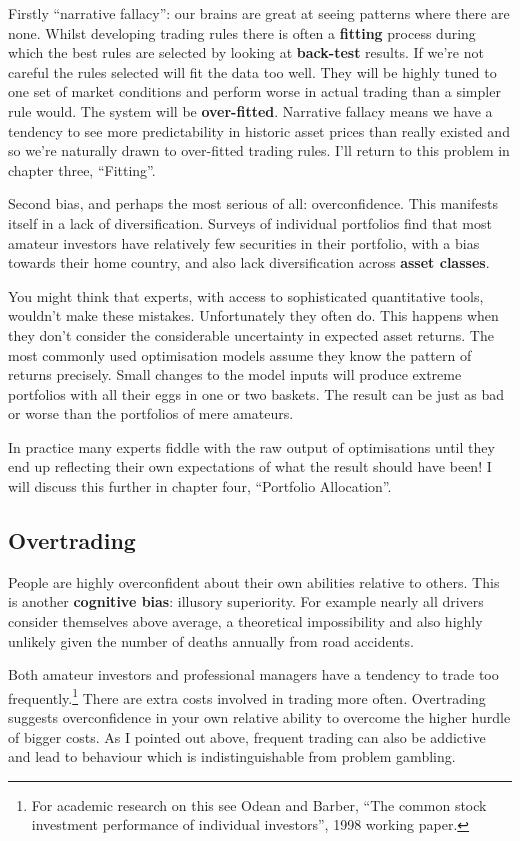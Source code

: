 Firstly ``narrative fallacy'': our brains are great at seeing patterns where there are none. Whilst developing trading rules there is often a \textbf{fitting} process during which the best rules are selected by looking at \textbf{back-test} results. If we're not careful the rules selected will fit the data too well. They will be highly tuned to one set of market conditions and perform worse in actual trading than a simpler rule would. The system will be \textbf{over-fitted}.
Narrative fallacy means we have a tendency to see more predictability in historic asset prices than really existed and so we're naturally drawn to over-fitted trading rules. I'll return to this problem in chapter three, ``Fitting''.

Second bias, and perhaps the most serious of all: overconfidence. This manifests itself in a lack of diversification. Surveys of individual portfolios find that most amateur investors have relatively few securities in their portfolio, with a bias towards their home country, and also lack diversification across \textbf{asset classes}.

You might think that experts, with access to sophisticated quantitative tools, wouldn't make these mistakes. Unfortunately they often do. This happens when they don't consider the considerable uncertainty in expected asset returns. The most commonly used optimisation models assume they know the pattern of returns precisely. Small changes to the model inputs will produce extreme portfolios with all their eggs in one or two baskets. The result can be just as bad or worse than the portfolios of mere amateurs.

In practice many experts fiddle with the raw output of optimisations until they end up reflecting their own expectations of what the result should have been! I will discuss this further in chapter four, ``Portfolio Allocation''.

\subsection*{Overtrading}

People are highly overconfident about their own abilities relative to others. This is another \textbf{cognitive bias}: illusory superiority. For example nearly all drivers consider themselves above average, a theoretical impossibility and also highly unlikely given the number of deaths annually from road accidents.

Both amateur investors and professional managers have a tendency to trade too frequently.\footnote{For academic research on this see Odean and Barber, ``The common stock investment performance of individual investors'', 1998 working paper.} There are extra costs involved in trading more often. Overtrading suggests overconfidence in your own relative ability to overcome the higher hurdle of bigger costs.
As I pointed out above, frequent trading can also be addictive and lead to behaviour which is indistinguishable from problem gambling.

